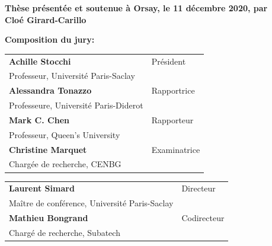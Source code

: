 \documentclass[12pt,a4paper]{book}
\begin{document}
\begin{titlepage}
\textbf{Thèse présentée et soutenue à Orsay, le 11 décembre 2020, par}\\
\bigskip
\Large {\color{Prune} \textbf{Cloé Girard-Carillo}}


\vspace{\fill} %

\flushleft \small \textbf{Composition du jury:}
\bigskip


\scriptsize
\begin{tabular}{|p{8cm}l}
\arrayrulecolor{Prune}
\textbf{Achille Stocchi} &   Président\\
Professeur, Université Paris-Saclay & \\
\textbf{Alessandra Tonazzo} &  Rapportrice \\
Professeure, Université Paris-Diderot   &   \\
\textbf{Mark C. Chen} &  Rapporteur \\
Professeur, Queen's University  &   \\
\textbf{Christine Marquet} &  Examinatrice \\
Chargée de recherche, CENBG   &   \\

\end{tabular}

\medskip
\begin{tabular}{|p{8cm}l}\arrayrulecolor{white}
\textbf{Laurent Simard} &   Directeur\\
Maître de conférence, Université Paris-Saclay & \\
\textbf{Mathieu Bongrand} &   Codirecteur\\
Chargé de recherche, Subatech  &   \\


\end{tabular}


\end{titlepage}
\end{document}
